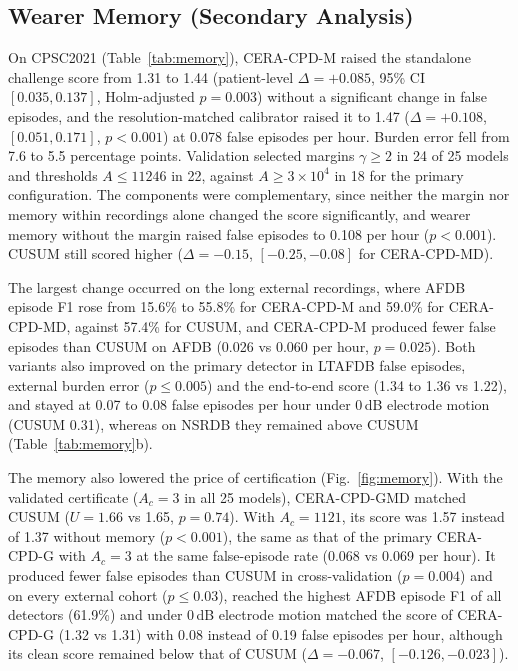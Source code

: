 \documentclass[preprint,12pt]{elsarticle}
\newcommand{\method}{CERA-CPD}
\newcommand{\1}{\mathbf{1}}
\begin{document}
\subsection{Wearer Memory (Secondary Analysis)}
\label{sec:res-memory}
On CPSC2021 (Table~\ref{tab:memory}), \method{}-M raised the standalone challenge score from 1.31 to 1.44 (patient-level $\Delta=+0.085$, 95\% CI $[0.035,0.137]$, Holm-adjusted $p=0.003$) without a significant change in false episodes, and the resolution-matched calibrator raised it to 1.47 ($\Delta=+0.108$, $[0.051,0.171]$, $p<0.001$) at 0.078 false episodes per hour. Burden error fell from 7.6 to 5.5 percentage points. Validation selected margins $\gamma\ge2$ in 24 of 25 models and thresholds $A\le11246$ in 22, against $A\ge3\times10^4$ in 18 for the primary configuration. The components were complementary, since neither the margin nor memory within recordings alone changed the score significantly, and wearer memory without the margin raised false episodes to 0.108 per hour ($p<0.001$). CUSUM still scored higher ($\Delta=-0.15$, $[-0.25,-0.08]$ for \method{}-MD).

The largest change occurred on the long external recordings, where AFDB episode F1 rose from 15.6\% to 55.8\% for \method{}-M and 59.0\% for \method{}-MD, against 57.4\% for CUSUM, and \method{}-M produced fewer false episodes than CUSUM on AFDB (0.026 vs 0.060 per hour, $p=0.025$). Both variants also improved on the primary detector in LTAFDB false episodes, external burden error ($p\le0.005$) and the end-to-end score (1.34 to 1.36 vs 1.22), and stayed at 0.07 to 0.08 false episodes per hour under 0\,dB electrode motion (CUSUM 0.31), whereas on NSRDB they remained above CUSUM (Table~\ref{tab:memory}b).

The memory also lowered the price of certification (Fig.~\ref{fig:memory}). With the validated certificate ($A_c=3$ in all 25 models), \method{}-GMD matched CUSUM ($U=1.66$ vs 1.65, $p=0.74$). With $A_c=1121$, its score was 1.57 instead of 1.37 without memory ($p<0.001$), the same as that of the primary \method{}-G with $A_c=3$ at the same false-episode rate (0.068 vs 0.069 per hour). It produced fewer false episodes than CUSUM in cross-validation ($p=0.004$) and on every external cohort ($p\le0.03$), reached the highest AFDB episode F1 of all detectors (61.9\%) and under 0\,dB electrode motion matched the score of \method{}-G (1.32 vs 1.31) with 0.08 instead of 0.19 false episodes per hour, although its clean score remained below that of CUSUM ($\Delta=-0.067$, $[-0.126,-0.023]$).
\end{document}
